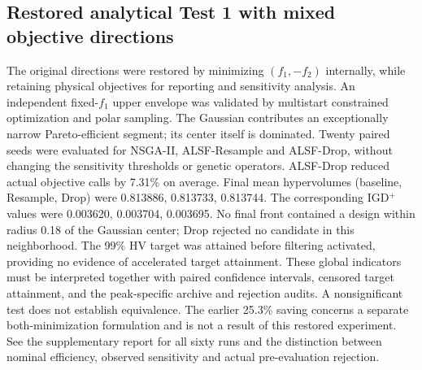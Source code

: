 \subsection{Restored analytical Test 1 with mixed objective directions}
The original directions were restored by minimizing $(f_1,-f_2)$ internally,
while retaining physical objectives for reporting and sensitivity analysis.
An independent fixed-$f_1$ upper envelope was validated by multistart constrained
optimization and polar sampling. The Gaussian contributes an exceptionally
narrow Pareto-efficient segment; its center itself is dominated. Twenty paired
seeds were evaluated for NSGA-II, ALSF-Resample and ALSF-Drop, without changing
the sensitivity thresholds or genetic operators.
ALSF-Drop reduced actual objective calls by 7.31\% on average. Final mean hypervolumes (baseline, Resample, Drop) were 0.813886, 0.813733, 0.813744. The corresponding IGD$^+$ values were 0.003620, 0.003704, 0.003695.
No final front contained a design within radius 0.18 of the Gaussian center; Drop rejected no candidate in this neighborhood. The 99\% HV target was attained before filtering activated, providing no evidence of accelerated target attainment. These global indicators must be interpreted together with paired confidence
intervals, censored target attainment, and the peak-specific archive and rejection
audits. A nonsignificant test does not establish equivalence. The earlier 25.3\%
saving concerns a separate both-minimization formulation and is not a result of
this restored experiment. See the supplementary report for all sixty runs and
the distinction between nominal efficiency, observed sensitivity and actual
pre-evaluation rejection.
